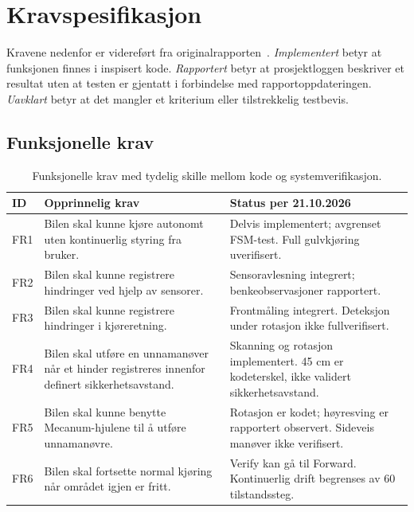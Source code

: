 \documentclass[a4paper,11pt,oneside]{report}
\begin{document}
\chapter{Kravspesifikasjon}\label{ch:krav}
Kravene nedenfor er videreført fra originalrapporten~\cite{original}.
\emph{Implementert} betyr at funksjonen finnes i inspisert kode.
\emph{Rapportert} betyr at prosjektloggen beskriver et resultat uten at testen
er gjentatt i forbindelse med rapportoppdateringen.
\emph{Uavklart} betyr at det mangler et kriterium eller tilstrekkelig testbevis.

\section{Funksjonelle krav}
\begin{table}[htbp]
\small
\begin{tabularx}{\textwidth}{@{}P{9mm}YP{46mm}@{}}
\toprule ID & Opprinnelig krav & Status per 21.10.2026\\\midrule
FR1 & Bilen skal kunne kjøre autonomt uten kontinuerlig styring fra bruker.
& Delvis implementert; avgrenset FSM-test. Full gulvkjøring uverifisert.\\
FR2 & Bilen skal kunne registrere hindringer ved hjelp av sensorer.
& Sensoravlesning integrert; benkeobservasjoner rapportert.\\
FR3 & Bilen skal kunne registrere hindringer i kjøreretning.
& Frontmåling integrert. Deteksjon under rotasjon ikke fullverifisert.\\
FR4 & Bilen skal utføre en unnamanøver når et hinder registreres innenfor definert sikkerhetsavstand.
& Skanning og rotasjon implementert. 45 cm er kodeterskel, ikke validert sikkerhetsavstand.\\
FR5 & Bilen skal kunne benytte Mecanum-hjulene til å utføre unnamanøvre.
& Rotasjon er kodet; høyresving er rapportert observert. Sideveis manøver ikke verifisert.\\
FR6 & Bilen skal fortsette normal kjøring når området igjen er fritt.
& Verify kan gå til Forward. Kontinuerlig drift begrenses av 60 tilstandssteg.\\
\bottomrule
\end{tabularx}
\caption{Funksjonelle krav med tydelig skille mellom kode og systemverifikasjon.}
\label{tab:fr}
\end{table}
\end{document}
